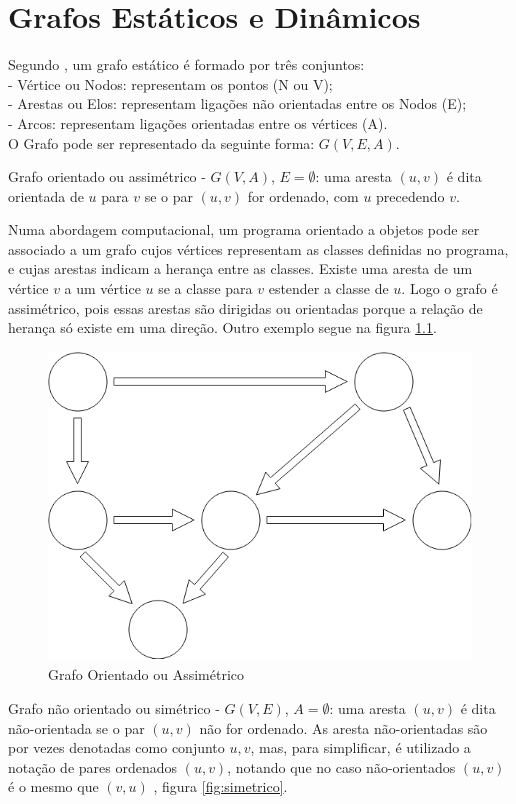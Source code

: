 \chapter{Grafos Estáticos e Dinâmicos} \label{grafoestdin}
Segundo \cite{negreirosbook}, um grafo estático é formado por três conjuntos:\\
- Vértice ou Nodos: representam os pontos (N ou V);\\
- Arestas ou Elos: representam ligações não orientadas entre os Nodos (E);\\
- Arcos: representam ligações orientadas entre os vértices (A).\\
O Grafo pode ser representado da seguinte forma: $G(V, E, A)$.

Grafo orientado ou assimétrico - $G(V, A)$, $E = \emptyset$: uma aresta $(u,v)$ é dita orientada de $u$
para $v$ se o par $(u,v)$ for ordenado, com $u$ precedendo $v$.

Numa abordagem computacional, um programa orientado a objetos pode ser associado a um grafo cujos vértices
representam as classes definidas no programa, e cujas arestas indicam a herança entre as classes.
Existe uma aresta de um vértice $v$ a um vértice $u$ se a classe para $v$ estender a classe de $u$.
Logo o grafo é assimétrico, pois essas arestas são dirigidas ou orientadas porque a relação de herança
só existe em uma direção. Outro exemplo segue na figura \ref{fig:assimetrico}.

\begin{figure}[htbp]
\centering
 \includegraphics[width=.35\textwidth]{chapters/fig/assimetrico1.png}
\caption{Grafo Orientado ou Assimétrico}
\label{fig:assimetrico}
\end{figure}

Grafo não orientado ou simétrico - $G(V, E)$, $A = \emptyset$: uma aresta $(u,v)$ é dita não-orientada
se o par $(u,v)$ não for ordenado. As aresta não-orientadas são por vezes denotadas como conjunto ${u,v}$,
mas, para simplificar, é utilizado a notação de pares ordenados $(u,v)$, notando que no caso não-orientados
$(u,v)$ é o mesmo que $(v,u)$ \cite{goodrich}, figura \ref{fig:simetrico}.


